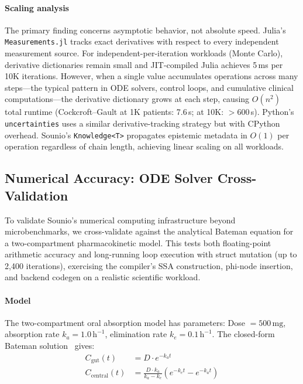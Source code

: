 \documentclass[11pt,a4paper]{article}
\begin{document}
\paragraph{Scaling analysis}
The primary finding concerns asymptotic behavior, not absolute speed.
Julia's \texttt{Measurements.jl} tracks exact derivatives with respect to
every independent measurement source. For independent-per-iteration workloads
(Monte Carlo), derivative dictionaries remain small and JIT-compiled Julia
achieves 5\,ms per 10K iterations. However, when a single value accumulates
operations across many steps---the typical pattern in ODE solvers, control
loops, and cumulative clinical computations---the derivative dictionary
grows at each step, causing $O(n^2)$ total runtime (Cockcroft--Gault at
1K patients: 7.6\,s; at 10K: $>$600\,s). Python's \texttt{uncertainties}
uses a similar derivative-tracking strategy but with CPython overhead.
Sounio's \texttt{Knowledge<T>} propagates epistemic metadata in $O(1)$
per operation regardless of chain length, achieving linear scaling on all
workloads.

\subsection{Numerical Accuracy: ODE Solver Cross-Validation}

To validate Sounio's numerical computing infrastructure beyond microbenchmarks,
we cross-validate against the analytical Bateman equation for a two-compartment
pharmacokinetic model. This tests both floating-point arithmetic accuracy and
long-running loop execution with struct mutation (up to 2,400 iterations),
exercising the compiler's SSA construction, phi-node insertion, and backend
codegen on a realistic scientific workload.

\paragraph{Model}
The two-compartment oral absorption model has parameters:
Dose $= 500\,\text{mg}$, absorption rate $k_a = 1.0\,\text{h}^{-1}$,
elimination rate $k_e = 0.1\,\text{h}^{-1}$.
The closed-form Bateman solution~\citep{gibaldi1982pharmacokinetics} gives:
\begin{align}
  C_{\text{gut}}(t) &= D \cdot e^{-k_a t} \\
  C_{\text{central}}(t) &= \frac{D \cdot k_a}{k_a - k_e}
    \left(e^{-k_e t} - e^{-k_a t}\right)
\end{align}
\end{document}
